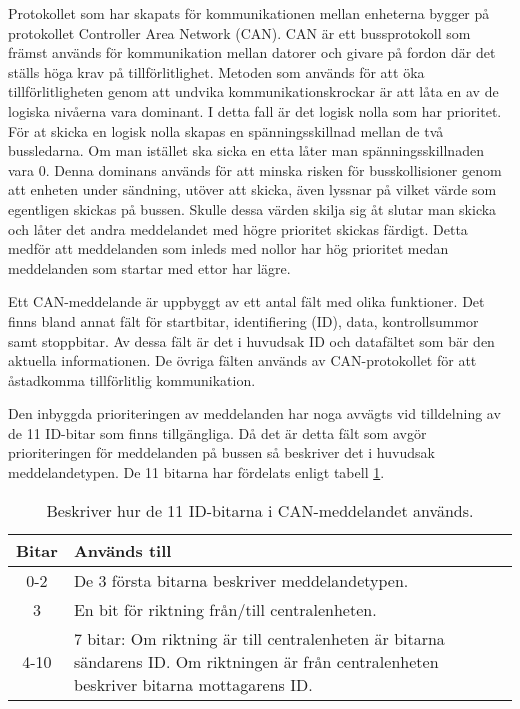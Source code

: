 Protokollet som har skapats för kommunikationen mellan enheterna bygger på protokollet Controller Area Network (CAN). CAN är ett bussprotokoll som främst används för kommunikation mellan datorer och givare på fordon där det ställs höga krav på tillförlitlighet. Metoden som används för att öka tillförlitligheten genom att undvika kommunikationskrockar är att låta en av de logiska nivåerna vara dominant. I detta fall är det logisk nolla som har prioritet. För at skicka en logisk nolla skapas en spänningsskillnad mellan de två bussledarna. Om man istället ska sicka en etta låter man spänningsskillnaden vara 0. Denna dominans används för att minska risken för busskollisioner genom att enheten under sändning, utöver att skicka, även lyssnar på vilket värde som egentligen skickas på bussen. Skulle dessa värden skilja sig åt slutar man skicka och låter det andra meddelandet med högre prioritet skickas färdigt. Detta medför att meddelanden som inleds med nollor har hög prioritet medan meddelanden som startar med ettor har lägre.

Ett CAN-meddelande är uppbyggt av ett antal fält med olika funktioner. Det finns bland annat fält för startbitar, identifiering (ID), data, kontrollsummor samt stoppbitar. Av dessa fält är det i huvudsak ID och datafältet som bär den aktuella informationen. De övriga fälten används av CAN-protokollet för att åstadkomma tillförlitlig kommunikation.

Den inbyggda prioriteringen av meddelanden har noga avvägts vid tilldelning av de 11 ID-bitar som finns tillgängliga. Då det är detta fält som avgör prioriteringen för meddelanden på bussen så beskriver det i huvudsak meddelandetypen. De 11 bitarna har fördelats enligt tabell \ref{tab:idbitar}.

\begin{table}[H]
	\centering
	\begin{tabular}{|c|p{}|}
		\hline
		Bitar 	& Används till \\ \hline \hline
		0-2		& De 3 första bitarna beskriver meddelandetypen. \\ \hline
		3		& En bit för riktning från/till centralenheten. \\ \hline
		4-10	& 7 bitar:
		Om riktning är till centralenheten är bitarna sändarens ID.
		Om riktningen är från centralenheten beskriver bitarna mottagarens ID. \\ \hline

	\end{tabular}
	\caption{Beskriver hur de 11 ID-bitarna i CAN-meddelandet används.}
	\label{tab:idbitar}
\end{table}


